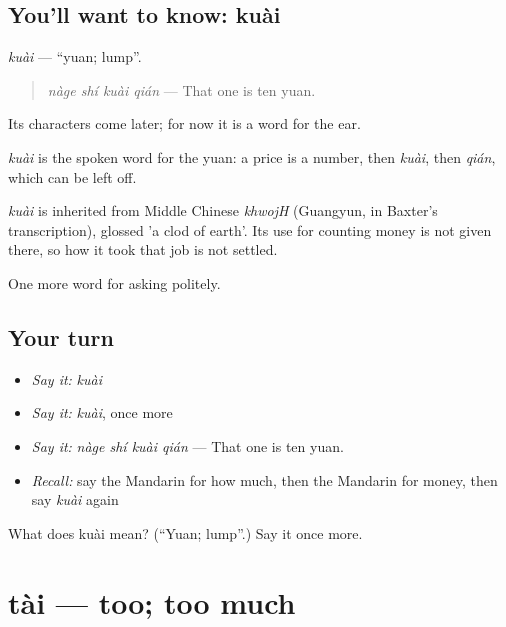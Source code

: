 \subsection*{You'll want to know: kuài}
\emph{kuài} — \textquotedblleft{}yuan; lump\textquotedblright{}.

\begin{quote}
\emph{nàge shí kuài qián} — That one is ten yuan.
\end{quote}

Its characters come later; for now it is a word for the ear.

\emph{kuài} is the spoken word for the yuan: a price is a number, then \emph{kuài}, then \emph{qián}, which can be left off.

\begin{cousinweb}
\emph{kuài} is inherited from Middle Chinese \emph{khwojH} (Guangyun, in Baxter's transcription), glossed 'a clod of earth'. Its use for counting money is not given there, so how it took that job is not settled.
\end{cousinweb}

\begin{grammarlens}[title={What you've built}]
One more word for asking politely.
\end{grammarlens}

\subsection*{Your turn}
\begin{itemize}
\raggedright
  \item \emph{Say it:} \emph{kuài}
  \item \emph{Say it:} \emph{kuài}, once more
  \item \emph{Say it:} \emph{nàge shí kuài qián} — That one is ten yuan.
  \item \emph{Recall:} say the Mandarin for how much, then the Mandarin for money, then say \emph{kuài} again
\end{itemize}

\begin{tcolorbox}[breakable,colback=teal!4,colframe=teal!35!black,title={Before you move on}]
What does kuài mean? (\textquotedblleft{}Yuan; lump\textquotedblright{}.) Say it once more.
\end{tcolorbox}
\section[tài]{tài — too; too much}

